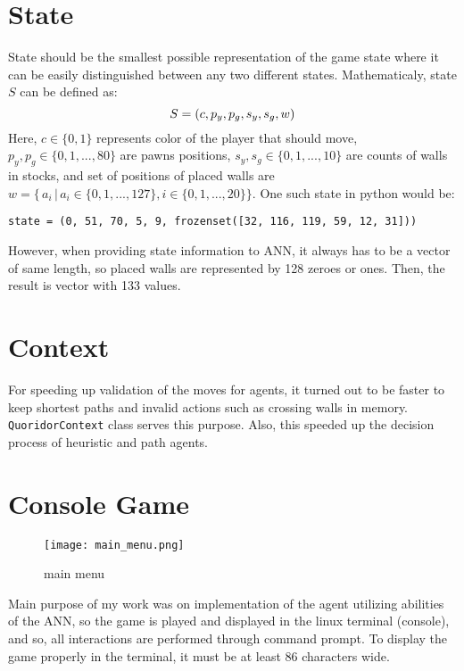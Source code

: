 \section{State}
State should be the smallest possible representation of the game state where
it can be easily distinguished between any two different states. Mathematicaly,
state $S$ can be defined as:
\begin{equation}
  \label{eqn:state_def}
  S = (c, p_y, p_g, s_y, s_g, w)
  \vspace*{-0.20cm}
\end{equation}
Here, $c\in\{0, 1\} $ represents color of the player that should move,
$p_y,p_g\in\{0,1,...,80\}$ are pawns positions,
${s_y},{s_g} \in \{0, 1, ..., 10\}$ are counts of walls in stocks,
and set of positions of placed walls are
${w = \{\,a_i\,|\,a_i \in \{0, 1, ..., 127\}, i \in \{0, 1, ..., 20\} \}}$.
One such state in python would be:
\begin{lstlisting}
state = (0, 51, 70, 5, 9, frozenset([32, 116, 119, 59, 12, 31]))
\end{lstlisting}

However, when providing state information to ANN, it always has to be a vector
of same length, so placed walls are represented by 128 zeroes or ones. Then,
the result is vector with 133 values.

\section{Context}
For speeding up validation of the moves for agents, it turned out to be faster
to keep shortest paths and invalid actions such as crossing walls in memory.
{\lstinline{QuoridorContext}} class serves this purpose.
Also, this speeded up the decision process of heuristic and path agents.

\section{Console Game}
\begin{wrapfigure}{r}{0.5\textwidth}
  \vspace*{-2.05cm}
  \centering
  \texttt{[image: main\_menu.png]}
  \vspace*{-0.35cm}
  \caption{main menu}
  \label{fig:main_menu}
  \vspace*{-0.70cm}
\end{wrapfigure}

Main purpose of my work was on implementation of the agent utilizing abilities
of the ANN, so the game is played and displayed in the linux terminal
(console), and so, all interactions are performed through command prompt.
To display the game properly in the terminal, it must be at least 86 characters
wide.

